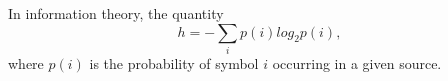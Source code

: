 In information theory,  the quantity
 \[ h=- \sum_i p(i) log_2 p(i), \] where  $ p(i) $  is the probability of
symbol  $ i $  occurring in a given source.


